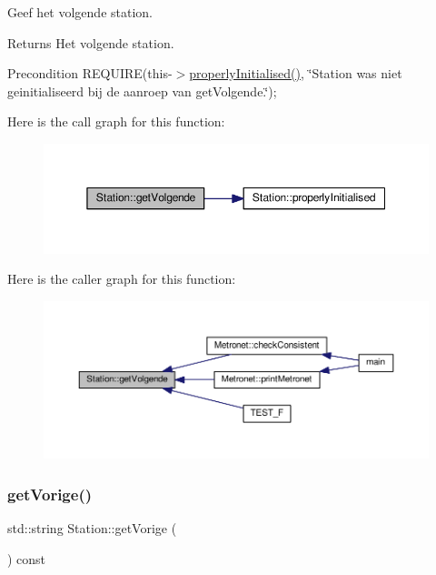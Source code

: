 Geef het volgende station. 

\begin{DoxyReturn}{Returns}
Het volgende station. 
\end{DoxyReturn}
\begin{DoxyPrecond}{Precondition}
R\+E\+Q\+U\+I\+RE(this-\/$>$\hyperlink{class_station_a9ce626dd0599e3ea8107404a59c21e16}{properly\+Initialised()}, \char`\"{}\+Station was niet geinitialiseerd bij de aanroep van get\+Volgende.\char`\"{}); 
\end{DoxyPrecond}
Here is the call graph for this function\+:\nopagebreak
\begin{figure}[H]
\begin{center}
\leavevmode
\includegraphics[width=350pt]{class_station_a1c9f9e7d77d74e7b06bf627bcb2c0067_cgraph}
\end{center}
\end{figure}
Here is the caller graph for this function\+:\nopagebreak
\begin{figure}[H]
\begin{center}
\leavevmode
\includegraphics[width=350pt]{class_station_a1c9f9e7d77d74e7b06bf627bcb2c0067_icgraph}
\end{center}
\end{figure}
\mbox{\label{class_station_a6776dd16c23da9f512d82883ea896fea}} 
\subsubsection{\texorpdfstring{get\+Vorige()}{getVorige()}}
{\footnotesize\ttfamily std\+::string Station\+::get\+Vorige (\begin{DoxyParamCaption}{ }\end{DoxyParamCaption}) const}




